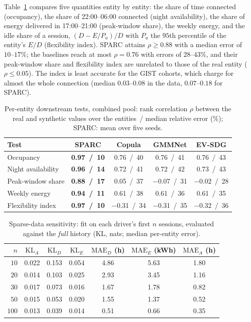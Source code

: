 \documentclass[journal]{IEEEtran}
\begin{document}
Table~\ref{tab:entity} compares five quantities entity by entity: the share of time connected (occupancy), the share of 22:00--06:00 connected (night availability), the share of energy delivered in 17:00--21:00 (peak-window share), the weekly energy, and the idle share of a session, $(D - E/P_u)/D$ with $P_u$ the $95$th percentile of the entity's $E/D$ (flexibility index). SPARC attains $\rho \geq 0.88$ with a median error of $10$--$17\%$; the baselines reach at most $\rho = 0.76$ with errors of $28$--$43\%$, and their peak-window share and flexibility index are unrelated to those of the real entity ($\rho \leq 0.05$). The index is least accurate for the GIST cohorts, which charge for almost the whole connection (median $0.03$--$0.08$ in the data, $0.07$--$0.18$ for SPARC).

\begin{table}[t]
\centering
\caption{Per-entity downstream tests, combined pool: rank correlation $\rho$ between the real and synthetic values over the entities~/ median relative error (\%); SPARC: mean over five seeds.}
\label{tab:entity}
\setlength{\tabcolsep}{3pt}
\footnotesize
\begin{tabular}{lcccc}
\toprule
Test & SPARC & Copula & GMMNet & EV-SDG \\
\midrule
Occupancy          & \textbf{0.97~/~10} & 0.76~/~40 & 0.76~/~41 & 0.76~/~43 \\
Night availability & \textbf{0.96~/~14} & 0.72~/~41 & 0.72~/~42 & 0.73~/~43 \\
Peak-window share  & \textbf{0.88~/~17} & 0.05~/~37 & $-$0.07~/~31 & $-$0.02~/~28 \\
Weekly energy      & \textbf{0.94~/~11} & 0.61~/~38 & 0.61~/~36 & 0.61~/~35 \\
Flexibility index  & \textbf{0.97~/~10} & $-$0.31~/~34 & $-$0.31~/~35 & $-$0.32~/~36 \\
\bottomrule
\end{tabular}
\end{table}

\begin{table}[t]
\centering
\caption{Sparse-data sensitivity: fit on each driver's first $n$ sessions, evaluated against the \emph{full} history (KL, nats; median per-entity error).}
\label{tab:lowdata}
\setlength{\tabcolsep}{4pt}
\footnotesize
\begin{tabular}{rcccccc}
\toprule
$n$ & $\mathrm{KL}_A$ & $\mathrm{KL}_D$ & $\mathrm{KL}_E$ & $\mathrm{MAE}_D$ (h) & $\mathrm{MAE}_E$ (kWh) & $\mathrm{MAE}_A$ (h) \\
\midrule
$10$  & 0.022 & 0.153 & 0.054 & 4.86 & 5.63 & 1.80 \\
$20$  & 0.014 & 0.103 & 0.025 & 2.93 & 3.45 & 1.16 \\
$30$  & 0.017 & 0.073 & 0.016 & 1.67 & 1.78 & 0.82 \\
$50$  & 0.015 & 0.053 & 0.020 & 1.55 & 1.37 & 0.52 \\
$100$ & 0.013 & 0.039 & 0.014 & 0.51 & 0.66 & 0.35 \\
\bottomrule
\end{tabular}
\end{table}
\end{document}
